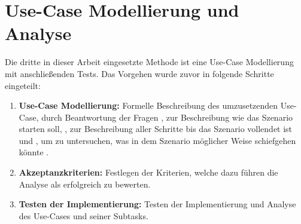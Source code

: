 \section{Use-Case Modellierung und Analyse}

Die dritte in dieser Arbeit eingesetzte Methode ist eine Use-Case Modellierung mit anschließenden Tests. Das Vorgehen wurde zuvor in folgende Schritte eingeteilt:
\begin{enumerate}
    \item \textbf{Use-Case Modellierung:} Formelle Beschreibung des umzusetzenden Use-Case, durch Beantwortung der Fragen \grqq{}, zur Beschreibung wie das Szenario starten soll, \grqq{}, zur Beschreibung aller Schritte bis das Szenario vollendet ist und \grqq{}, um zu untersuchen, was in dem Szenario möglicher Weise schiefgehen könnte \cite[Vgl.][S. 52]{Rosenberg2007}.
    \item \textbf{Akzeptanzkriterien:} Festlegen der Kriterien, welche dazu führen die Analyse als erfolgreich zu bewerten.
    \item \textbf{Testen der Implementierung:} Testen der Implementierung und Analyse des Use-Cases und seiner Subtasks.
\end{enumerate}